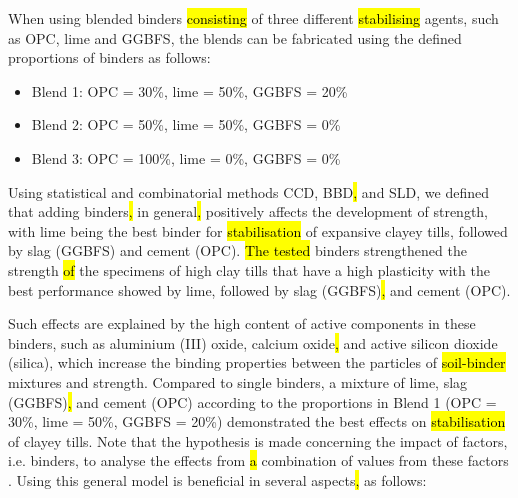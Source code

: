 \documentclass[eprint,
]{actapoly}
\begin{document}
When using blended binders \hl{consisting} of three different \hl{stabilising} agents, such as OPC, lime and GGBFS, the blends can be fabricated using the defined proportions of binders as follows:

\begin{itemize}
	\item [--] Blend 1: OPC = 30\%, lime = 50\%, GGBFS = 20\%
	\item [--] Blend 2: OPC = 50\%, lime = 50\%, GGBFS = 0\%
	\item [--] Blend 3: OPC = 100\%, lime = 0\%, GGBFS = 0\%
\end{itemize}

Using statistical and combinatorial methods CCD, BBD\hl{, }and SLD, we defined that adding binders\hl{, }in general\hl{, }positively affects the development of strength, with lime being the best binder for \hl{stabilisation} of expansive clayey tills, followed by slag (GGBFS) and cement (OPC). \hl{The tested} binders strengthened the strength \hl{of} the specimens of high clay tills that have a high plasticity with the best performance showed by lime, followed by slag (GGBFS)\hl{, }and cement (OPC). 

Such effects are explained by the high content of active components in these binders, such as aluminium (III) oxide, calcium oxide\hl{, }and active silicon dioxide (silica), which increase\hl{ }the binding properties between the particles of \hl{soil-binder} mixtures and strength. Compared to single binders, a mixture of lime, slag (GGBFS)\hl{, }and cement (OPC) according to the proportions in Blend 1 (OPC = 30\%, lime = 50\%, GGBFS = 20\%) demonstrated the best effects on \hl{stabilisation} of clayey tills. Note that the hypothesis is made concerning the impact of factors, i.e.\hl{ }binders, to analyse the effects from \hl{a} combination of values from these factors \cite{StatSoft}. Using this general model is beneficial in several aspects\hl{, }as follows:
\end{document}
